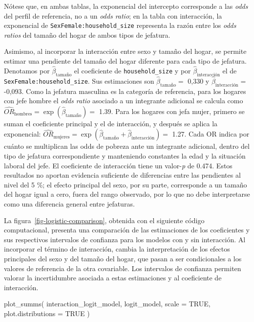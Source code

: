 \documentclass[
  spanish,
  11pt,
  letterpaper,
  oneside,
  open=any]{scrbook}
\newenvironment{Shaded}{\begin{snugshade}}{\end{snugshade}}
\newcommand{\AttributeTok}[1]{\textcolor[rgb]{0.40,0.45,0.13}{#1}}
\newcommand{\ConstantTok}[1]{\textcolor[rgb]{0.56,0.35,0.01}{#1}}
\newcommand{\FunctionTok}[1]{\textcolor[rgb]{0.28,0.35,0.67}{#1}}
\newcommand{\NormalTok}[1]{\textcolor[rgb]{0.00,0.23,0.31}{#1}}
\begin{document}
Nótese que, en ambas tablas, la exponencial del intercepto corresponde a
las \emph{odds} del perfil de referencia, no a un \emph{odds ratio}; en
la tabla con interacción, la exponencial de
\texttt{SexFemale:household\_size} representa la razón entre los
\emph{odds ratios} del tamaño del hogar de ambos tipos de jefatura.

Asimismo, al incorporar la interacción entre sexo y tamaño del hogar, se
permite estimar una pendiente del tamaño del hogar diferente para cada
tipo de jefatura. Denotamos por \(\hat\beta_{\mathrm{tamaño}}\) el
coeficiente de \texttt{household\_size} y por
\(\hat\beta_{\mathrm{interacción}}\) el de
\texttt{SexFemale:household\_size}. Sus estimaciones son
\(\hat\beta_{\mathrm{tamaño}}=\) 0,330 y
\(\hat\beta_{\mathrm{interacción}}=\) -0,093. Como la jefatura masculina
es la categoría de referencia, para los hogares con jefe hombre el
\emph{odds ratio} asociado a un integrante adicional se calcula como
\(\widehat{OR}_{\mathrm{hombres}}=\exp(\hat\beta_{\mathrm{tamaño}})=\)
1.39. Para los hogares con jefa mujer, primero se suman el coeficiente
principal y el de interacción, y después se aplica la exponencial:
\(\widehat{OR}_{\mathrm{mujeres}}=\exp(\hat\beta_{\mathrm{tamaño}}+\hat\beta_{\mathrm{interacción}})=\)
1.27. Cada OR indica por cuánto se multiplican las odds de pobreza ante
un integrante adicional, dentro del tipo de jefatura correspondiente y
manteniendo constantes la edad y la situación laboral del jefe. El
coeficiente de interacción tiene un valor-\emph{p} de 0.474. Estos
resultados no aportan evidencia suficiente de diferencias entre las
pendientes al nivel del 5 \%; el efecto principal del sexo, por su
parte, corresponde a un tamaño del hogar igual a cero, fuera del rango
observado, por lo que no debe interpretarse como una diferencia general
entre jefaturas.

La figura~\ref{fig-logistic-comparison}, obtenida con el siguiente
código computacional, presenta una comparación de las estimaciones de
los coeficientes y sus respectivos intervalos de confianza para los
modelos con y sin interacción. Al incorporar el término de interacción,
cambia la interpretación de los efectos principales del sexo y del
tamaño del hogar, que pasan a ser condicionales a los valores de
referencia de la otra covariable. Los intervalos de confianza permiten
valorar la incertidumbre asociada a estas estimaciones y al coeficiente
de interacción.

\begin{Shaded}
\begin{Highlighting}[]
\FunctionTok{plot\_summs}\NormalTok{(}
\NormalTok{  interaction\_logit\_model,}
\NormalTok{  logit\_model,}
  \AttributeTok{scale =} \ConstantTok{TRUE}\NormalTok{,}
  \AttributeTok{plot.distributions =} \ConstantTok{TRUE}
\NormalTok{)}
\end{Highlighting}
\end{Shaded}
\end{document}
